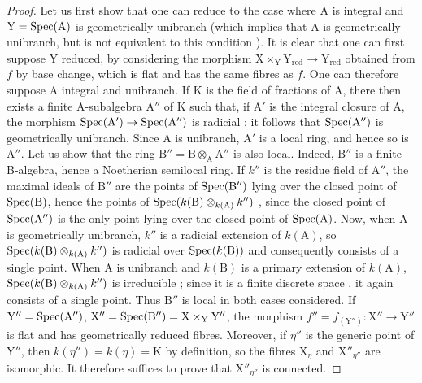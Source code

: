 \begin{proof}
Let us first show that one can reduce to the case where A is integral and $\mathrm{Y}=\operatorname{Spec}(\mathrm{A})$ is geometrically unibranch  (which implies that A is geometrically unibranch, but is not equivalent to this condition ).
It is clear that one can first suppose Y reduced, by considering the morphism $\mathrm{X}\times_{\mathrm{Y}}\mathrm{Y}_{\mathrm{red}}\to\mathrm{Y}_{\mathrm{red}}$ obtained from $f$ by base change, which is flat and has the same fibres as $f$.
One can therefore suppose A integral and unibranch.
If K is the field of fractions of A, there then exists a finite A-subalgebra $\mathrm{A}''$ of K such that, if $\mathrm{A}'$ is the integral closure of A, the morphism $\operatorname{Spec}(\mathrm{A}')\to\operatorname{Spec}(\mathrm{A}'')$ is radicial ; it follows  that $\operatorname{Spec}(\mathrm{A}'')$ is geometrically unibranch.
Since A is unibranch, $\mathrm{A}'$ is a local ring, and hence so is $\mathrm{A}''$.
Let us show that the ring $\mathrm{B}''=\mathrm{B}\otimes_{\mathrm{A}}\mathrm{A}''$ is also local.
Indeed, $\mathrm{B}''$ is a finite B-algebra, hence a Noetherian semilocal ring.
If $k''$ is the residue field of $\mathrm{A}''$, the maximal ideals of $\mathrm{B}''$ are the points of $\operatorname{Spec}(\mathrm{B}'')$ lying over the closed point of $\operatorname{Spec}(\mathrm{B})$, hence the points of $\operatorname{Spec}(k(\mathrm{B})\otimes_{k(\mathrm{A})}k'')$ ,
since the closed point of $\operatorname{Spec}(\mathrm{A}'')$ is the only point lying over the closed point of $\operatorname{Spec}(\mathrm{A})$.
Now, when A is geometrically unibranch, $k''$ is a radicial extension of $k(\mathrm{A})$, so $\operatorname{Spec}(k(\mathrm{B})\otimes_{k(\mathrm{A})}k'')$ is radicial over $\operatorname{Spec}(k(\mathrm{B}))$ and consequently consists of a single point.
When A is unibranch and $k(\mathrm{B})$ is a primary extension of $k(\mathrm{A})$, $\operatorname{Spec}(k(\mathrm{B})\otimes_{k(\mathrm{A})}k'')$ is irreducible ; since it is a finite discrete space , it again consists of a single point.
Thus $\mathrm{B}''$ is local in both cases considered.
If $\mathrm{Y}''=\operatorname{Spec}(\mathrm{A}'')$, $\mathrm{X}''=\operatorname{Spec}(\mathrm{B}'')=\mathrm{X}\times_{\mathrm{Y}}\mathrm{Y}''$, the morphism $f''=f_{(\mathrm{Y}'')}:\mathrm{X}''\to\mathrm{Y}''$ is flat and has geometrically reduced fibres.
Moreover, if $\eta''$ is the generic point of $\mathrm{Y}''$, then $k(\eta'')=k(\eta)=\mathrm{K}$ by definition, so the fibres $\mathrm{X}_\eta$ and $\mathrm{X}''_{\eta''}$ are isomorphic.
It therefore suffices to prove that $\mathrm{X}''_{\eta''}$ is connected.
\end{proof}


